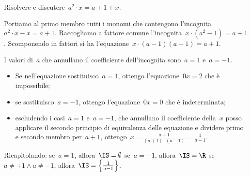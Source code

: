  \begin{esempio}{}{}
Risolvere e discutere~\(a^{2}\cdot x=a+1+x\).

Portiamo al primo membro tutti i monomi che contengono 
l'incognita~\(a^{2}\cdot x-x=a+1\).
Raccogliamo a fattore comune l'incognita~\(x\cdot \left(a^{2}-1\right)=a+1\).
Scomponendo in fattori si ha 
l'equazione~\(x\cdot \left(a-1\right)\left(a+1\right)=a+1\).

I valori di~\(a\) che annullano il coefficiente dell'incognita 
sono~\(a=1\) e~\(a=-1\).
\begin{itemize}[nosep]
 \item Se nell'equazione sostituisco~\(a=1\), ottengo l'equazione~\(0x=2\) 
che è 
 impossibile;
 \item se sostituisco~\(a=-1\), ottengo l'equazione~\(0x=0\) che è 
indeterminata;
 \item escludendo i casi~\(a=1\) e~\(a=-1\), che annullano il coefficiente 
  della~\(x\) posso applicare il secondo principio
  di equivalenza delle equazione e dividere primo e secondo membro 
  per~\(a+1\), 
  ottengo~\(x=\frac{a+1}{\left(a+1\right)\cdot 
\left(a-1\right)}=\frac{1}{a-1}\).
\end{itemize}
 \end{esempio}
Ricapitolando:
se~\(a=1\), 
allora~\(\IS=\emptyset\) se~\(a=-1\), allora~\(\IS=\R\) 
se~\(a\neq +1\wedge a\neq -1\), 
allora~\(\IS=\left\{\frac{1}{a-1}\right\}\).\vspace*{1.05ex}

